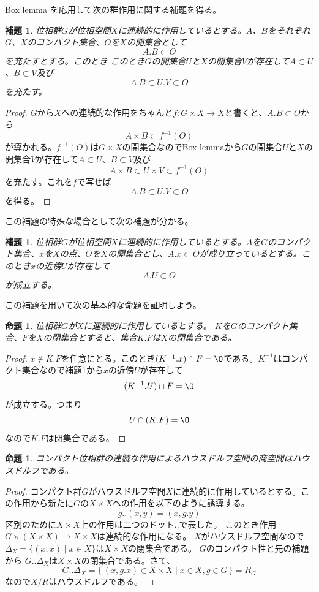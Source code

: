 \documentclass[leqno]{jsarticle}
\newtheorem{prop}[thm]{命題}
\newtheorem{lem}[thm]{補題}
\begin{document}
Box lemma を応用して次の群作用に関する補題を得る。
\begin{lem}
位相群$G$が位相空間$X$に連続的に作用しているとする。$A$、$B$をそれぞれ$G$、$X$のコンパクト集合、$O$を$X$の開集合として
\[
A.B\subset O
\]
を充たすとする。このとき
このとき$G$の開集合$U$と$X$の開集合$V$が存在して$A\subset U$、$B\subset V$及び
\[
A.B\subset U.V\subset O
\]
を充たす。
\end{lem}
\begin{proof}
$G$から$X$への連続的な作用をちゃんと$f:G\times X\to X$と書くと、$A.B\subset O$から
\[
A\times B\subset f^{-1}(O)
\]
が導かれる。$f^{-1}(O)$は$G\times X$の開集合なのでBox lemmaから$G$の開集合$U$と$X$の開集合$V$が存在して$A\subset U$、$B\subset V$及び
\[
A\times B\subset U\times V\subset f^{-1}(O)
\]
を充たす。これを$f$で写せば
\[
A.B\subset U.V\subset O
\]
を得る。
\end{proof}
この補題の特殊な場合として次の補題が分かる。
\begin{lem}\label{bb}
位相群$G$が位相空間$X$に連続的に作用しているとする。$A$を$G$のコンパクト集合、$x$を$X$の点、$O$を$X$の開集合とし、$A.x\subset O$が成り立っているとする。このとき$x$の近傍$U$が存在して
\[
A.U\subset O
\]
が成立する。
\end{lem}
この補題を用いて次の基本的な命題を証明しよう。
\begin{prop}
位相群$G$が$X$に連続的に作用しているとする。
$K$を$G$のコンパクト集合、$F$を$X$の閉集合とすると、集合$K.F$は$X$の閉集合である。
\end{prop}
\begin{proof}
$x\not\in K.F$を任意にとる。このとき$(K^{-1}.x)\cap F=\O$である。$K^{-1}$はコンパクト集合なので補題\ref{bb}から$x$の近傍$U$が存在して
\[
(K^{-1}.U)\cap F=\O
\]
が成立する。つまり
\[
U\cap (K.F)=\O
\]
なので$K.F$は閉集合である。
\end{proof}

\begin{prop}\label{cpt}
コンパクト位相群の連続な作用によるハウスドルフ空間の商空間はハウスドルフである。
\end{prop}
\begin{proof}
コンパクト群$G$がハウスドルフ空間$X$に連続的に作用しているとする。この作用から新たに$G$の$X\times X$への作用を以下のように誘導する。
\[
g..(x,y)=(x,g.y)
\]
区別のために$X\times X$上の作用は二つのドット$..$で表した。
このとき作用$G\times (X\times X)\to X\times X$は連続的な作用になる。
$X$がハウスドルフ空間なので$\Delta_X=\{(x,x)\mid x\in X\}$は$X\times X$の閉集合である。
$G$のコンパクト性と先の補題から
$G..\Delta_X$は$X\times X$の閉集合である。さて、
\[
G..\Delta_X=\{\,(x,g.x)\in X\times X\mid x\in X, g\in G\,\}=R_G
\]
なので$X/R$はハウスドルフである。
\end{proof}
\end{document}
